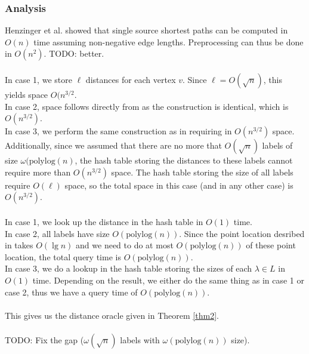 \subsubsection{Analysis}
Henzinger et al. showed that single source shortest paths can be computed in $O(n)$ time
\cite{henzinger1997faster} assuming non-negative edge lengths. Preprocessing can thus be done in $O(n^2)$. TODO: better. \\
\\
In case 1, we store $\ell$ distances for each vertex $v$. Since $\ell=O(\sqrt{n})$, this
yields space $O(n^{3/2}$. \\
In case 2, space follows directly from \cite{gawrychowski2017better} as the construction
is identical, which is $O(n^{3/2})$. \\
In case 3, we perform the same construction as in \cite{gawrychowski2017better} requiring
in $O(n^{3/2})$ space. Additionally, since we assumed that there are no more that
$O(\sqrt{n})$ labels of size $\omega(\text{polylog}(n)$, the hash table storing the
distances to these labels cannot require more than $O(n^{3/2})$ space. The hash table
storing the size of all labels require $O(\ell)$ space, so the total space
in this case (and in any other case) is $O(n^{3/2})$.\\
\\
In case 1, we look up the distance in the hash table in $O(1)$ time.\\
In case 2, all labels have size $O(\text{polylog}(n))$. Since the point location desribed
in \cite{gawrychowski2017better} takes $O(\lg n)$ and we need to do at most
$O(\text{polylog}(n))$ of these point location, the total query time is
$O(\text{polylog}(n))$. \\
In case 3, we do a lookup in the hash table storing the sizes of each $\lambda\in L$ in
$O(1)$ time. Depending on the result, we either do the same thing as in case 1 or case 2,
thus we have a query time of $O(\text{polylog}(n))$. \\
\\
This gives us the distance oracle given in Theorem \ref{thm2}. \\
\\
TODO: Fix the gap ($\omega(\sqrt{n})$ labels with $\omega(\text{polylog}(n))$ size).

